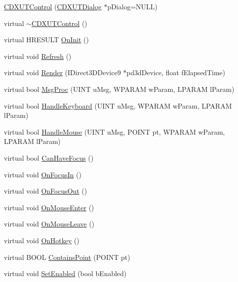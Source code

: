 \begin{DoxyCompactItemize}
\item 
\hyperlink{class_c_d_x_u_t_control_abbc50ddb4a91fe52f122787637efc715}{CDXUTControl} (\hyperlink{class_c_d_x_u_t_dialog}{CDXUTDialog} $\ast$pDialog=NULL)
\item 
virtual \hyperlink{class_c_d_x_u_t_control_a6277d18331e2a28fdc6aa9b588de8857}{$\sim$CDXUTControl} ()
\item 
virtual HRESULT \hyperlink{class_c_d_x_u_t_control_a8f1418d201b97e0a9dc83a0e25207eca}{OnInit} ()
\item 
virtual void \hyperlink{class_c_d_x_u_t_control_a6d81df6b2d6739e44b4b4aee9ab156b1}{Refresh} ()
\item 
virtual void \hyperlink{class_c_d_x_u_t_control_afd92fa04241f66fdbf207bc5870c9388}{Render} (IDirect3DDevice9 $\ast$pd3dDevice, float fElapsedTime)
\item 
virtual bool \hyperlink{class_c_d_x_u_t_control_a58d0d118146c8853a7ccd27da9e3fcf3}{MsgProc} (UINT uMsg, WPARAM wParam, LPARAM lParam)
\item 
virtual bool \hyperlink{class_c_d_x_u_t_control_a94044e608adeac7c329d83cf63587dcf}{HandleKeyboard} (UINT uMsg, WPARAM wParam, LPARAM lParam)
\item 
virtual bool \hyperlink{class_c_d_x_u_t_control_a263979b3221cb7a44b4caea72366c335}{HandleMouse} (UINT uMsg, POINT pt, WPARAM wParam, LPARAM lParam)
\item 
virtual bool \hyperlink{class_c_d_x_u_t_control_a5b2c6c474236a79b257c86caded9c0b7}{CanHaveFocus} ()
\item 
virtual void \hyperlink{class_c_d_x_u_t_control_ab363eb5e296ddfc577f81bcd7667fd9b}{OnFocusIn} ()
\item 
virtual void \hyperlink{class_c_d_x_u_t_control_afd5667a4ba9349e98db8c27a1b1d280d}{OnFocusOut} ()
\item 
virtual void \hyperlink{class_c_d_x_u_t_control_a0bb610c517415f885989136bd7797229}{OnMouseEnter} ()
\item 
virtual void \hyperlink{class_c_d_x_u_t_control_ad641d612cbdeb58ab6fcadff807206d1}{OnMouseLeave} ()
\item 
virtual void \hyperlink{class_c_d_x_u_t_control_a493169ad5b2877d6353eea95b697208e}{OnHotkey} ()
\item 
virtual BOOL \hyperlink{class_c_d_x_u_t_control_a9b4410bbd1cac9a0ffce760aaa9a2d48}{ContainsPoint} (POINT pt)
\item 
virtual void \hyperlink{class_c_d_x_u_t_control_afd0951616c5e521a12746df0637364f7}{SetEnabled} (bool bEnabled)

\end{DoxyCompactItemize}

